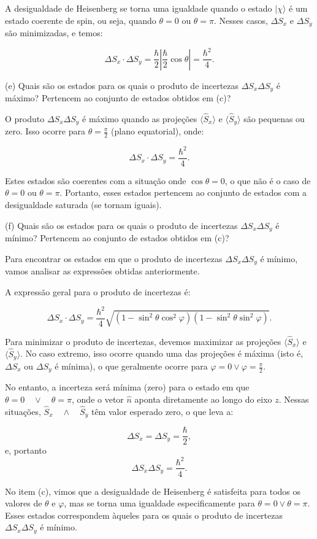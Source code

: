 \documentclass[12pt]{article}
\begin{document}
\begin{enumerate}
A desigualdade de Heisenberg se torna uma igualdade quando o estado \(|\chi\rangle\) é um estado coerente de spin, ou seja, quando \( \theta = 0 \) ou \( \theta = \pi \). Nesses casos, \(\Delta S_x\) e \(\Delta S_y\) são minimizadas, e temos:

\[
\Delta S_x \cdot \Delta S_y = \frac{\hbar}{2} \left|\frac{\hbar}{2} \cos\theta \right| = \frac{\hbar^2}{4}.
\]

(e) Quais são os estados para os quais o produto de incertezas $\Delta S_x \Delta S_y$ é máximo? Pertencem ao conjunto de estados obtidos em (c)?

O produto \(\Delta S_x \Delta S_y\) é máximo quando as projeções \( \langle \hat{S}_x \rangle \) e \( \langle \hat{S}_y \rangle \) são pequenas ou zero. Isso ocorre para \(\theta = \frac{\pi}{2}\) (plano equatorial), onde:

\[
\Delta S_x \cdot \Delta S_y = \frac{\hbar^2}{4}.
\]

Estes estados são coerentes com a situação onde \(\cos\theta = 0\), o que não é o caso de \(\theta = 0\) ou \(\theta = \pi\). Portanto, esses estados pertencem ao conjunto de estados com a desigualdade saturada (se tornam iguais).

(f) Quais são os estados para os quais o produto de incertezas $\Delta S_x \Delta S_y$ é mínimo? Pertencem ao conjunto de estados obtidos em (c)?

Para encontrar os estados em que o produto de incertezas \(\Delta S_x \Delta S_y\) é mínimo, vamos analisar as expressões obtidas anteriormente.

A expressão geral para o produto de incertezas é:

\[
\Delta S_x \cdot \Delta S_y = \frac{\hbar^2}{4} \sqrt{(1 - \sin^2\theta \cos^2\varphi)(1 - \sin^2\theta \sin^2\varphi)}.
\]

Para minimizar o produto de incertezas, devemos maximizar as projeções $\langle \hat{S}_x \rangle$ e $\langle \hat{S}_y \rangle$. No caso extremo, isso ocorre quando uma das projeções é máxima (isto é, $\Delta S_x$ ou $\Delta S_y$ é mínima), o que geralmente ocorre para $\varphi = 0 \lor \varphi = \frac{\pi}{2}$.

No entanto, a incerteza será mínima (zero) para o estado em que $\theta = 0 \quad \lor \quad \theta = \pi$, onde o vetor $\hat{n}$ aponta diretamente ao longo do eixo $z$. Nessas situações, $\hat{S}_x \quad \wedge \quad \hat{S}_y$ têm valor esperado zero, o que leva a:

\[
\Delta S_x = \Delta S_y = \frac{\hbar}{2},  
\]
e, portanto 
\[
\Delta S_x \Delta S_y = \frac{\hbar^2}{4}.
\]

No item (c), vimos que a desigualdade de Heisenberg é satisfeita para todos os valores de \(\theta\) e \(\varphi\), mas se torna uma igualdade especificamente para \(\theta = 0 \lor \theta = \pi\). Esses estados correspondem àqueles para os quais o produto de incertezas \(\Delta S_x \Delta S_y\) é mínimo.



\end{enumerate}
\end{document}
